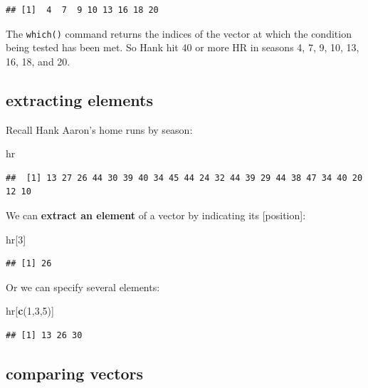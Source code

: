 \documentclass[
]{book}
\newenvironment{Shaded}{\begin{snugshade}}{\end{snugshade}}
\newcommand{\DecValTok}[1]{\textcolor[rgb]{0.00,0.00,0.81}{#1}}
\newcommand{\FunctionTok}[1]{\textcolor[rgb]{0.13,0.29,0.53}{\textbf{#1}}}
\newcommand{\NormalTok}[1]{#1}
\theoremstyle{definition}
\theoremstyle{definition}
\theoremstyle{definition}
\theoremstyle{definition}
\theoremstyle{remark}
\begin{document}
\begin{verbatim}
## [1]  4  7  9 10 13 16 18 20
\end{verbatim}

The \texttt{which()} command returns the indices of the vector at which the condition being tested has been met. So Hank hit 40 or more HR in seasons 4, 7, 9, 10, 13, 16, 18, and 20.

\subsection*{extracting elements}\label{extracting-elements}

Recall Hank Aaron's home runs by season:

\begin{Shaded}
\begin{Highlighting}[]
\NormalTok{hr}
\end{Highlighting}
\end{Shaded}

\begin{verbatim}
##  [1] 13 27 26 44 30 39 40 34 45 44 24 32 44 39 29 44 38 47 34 40 20 12 10
\end{verbatim}

We can \textbf{extract an element} of a vector by indicating its {[}position{]}:

\begin{Shaded}
\begin{Highlighting}[]
\NormalTok{hr[}\DecValTok{3}\NormalTok{]}
\end{Highlighting}
\end{Shaded}

\begin{verbatim}
## [1] 26
\end{verbatim}

Or we can specify several elements:

\begin{Shaded}
\begin{Highlighting}[]
\NormalTok{hr[}\FunctionTok{c}\NormalTok{(}\DecValTok{1}\NormalTok{,}\DecValTok{3}\NormalTok{,}\DecValTok{5}\NormalTok{)]}
\end{Highlighting}
\end{Shaded}

\begin{verbatim}
## [1] 13 26 30
\end{verbatim}

\subsection*{comparing vectors}\label{comparing-vectors}
\end{document}
